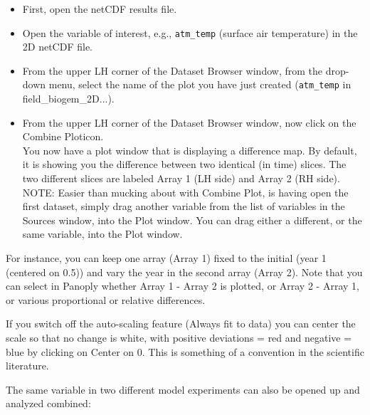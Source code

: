 \documentclass[11pt,fleqn]{book} %
\begin{document}
\begin{itemize}
\vspace{1mm}
\item First, open the netCDF results file.
\vspace{1mm}
\item Open the variable of interest, e.g., \texttt{atm\_temp} (surface air temperature) in the 2D netCDF file. 
\vspace{-4mm}
\item From the upper LH corner of the Dataset Browser window, from the drop-down menu, select the name of the plot you have just created (\texttt{atm\_temp} in \footnotesize\textsf{field\_biogem\_2D}\normalsize ...).
\vspace{1mm}
\item From the upper LH corner of the Dataset Browser window, now click on the \footnotesize\textsf{Combine Plot}\normalsize icon.
\\ You now have a plot window that is displaying a difference map. By default, it is showing you the difference between two identical (in time) slices. The two different slices are labeled Array 1 (LH side) and Array 2 (RH side).
\\NOTE: Easier than mucking about with \footnotesize\textsf{Combine Plot}\normalsize, is having open the first dataset, simply drag another variable from the list of variables in the \footnotesize\textsf{Sources }\normalsize window, into the \footnotesize\textsf{Plot }\normalsize window. You can drag either a different, or the same variable, into the \footnotesize\textsf{Plot }\normalsize window.
\end{itemize}
\vspace{2mm}

For instance, you can keep one array (Array 1) fixed to the initial (year 1 (centered on 0.5)) and vary the year in the second array (Array 2). Note that you can select in Panoply whether Array 1 - Array 2 is plotted, or Array 2 - Array 1, or various proportional or relative differences.

If you switch off the auto-scaling feature (\footnotesize\textsf{Always fit to data}\normalsize) you can center the scale so that no change is white, with positive deviations = red and negative = blue by clicking on Center on 0. This is something of a convention in the scientific literature.

The same variable in two different model experiments can also be opened up and analyzed combined: 
\end{document}

